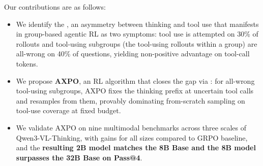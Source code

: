 Our contributions are as follows:
\begin{itemize}[leftmargin=*, itemsep=2pt]
    \item We identify the \textbf{\gap}, an asymmetry between thinking and tool use that manifests in group-based agentic RL as two symptoms: tool use is attempted on 30\% of rollouts and tool-using subgroups (the tool-using rollouts within a group) are all-wrong on 40\% of questions, yielding non-positive advantage on tool-call tokens.
    \item We propose \textbf{AXPO}, an RL algorithm that closes the gap via \emph{\toolresample}: for all-wrong tool-using subgroups, AXPO fixes the thinking prefix at uncertain tool calls and resamples from them, provably dominating from-scratch sampling on tool-use coverage at fixed budget.
    \item We validate AXPO on nine multimodal benchmarks across three scales of Qwen3-VL-Thinking, with gains for all sizes compared to GRPO baseline, and the \textbf{resulting 2B model matches the 8B Base and the 8B model surpasses the 32B Base on Pass@4}.
\end{itemize}
